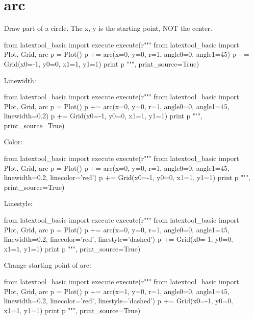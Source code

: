 \section{arc}

Draw part of a circle.
The x, y is the starting point, NOT the center.
{\small
\begin{python}
from latextool_basic import execute
execute(r"""
from latextool_basic import Plot, Grid, arc
p = Plot()
p += arc(x=0, y=0, r=1, angle0=0, angle1=45)
p += Grid(x0=-1, y0=0, x1=1, y1=1)
print p
""", print_source=True)
\end{python}
}





Linewidth:
{\small
\begin{python}
from latextool_basic import execute
execute(r"""
from latextool_basic import Plot, Grid, arc
p = Plot()
p += arc(x=0, y=0, r=1, angle0=0, angle1=45, linewidth=0.2)
p += Grid(x0=-1, y0=0, x1=1, y1=1)
print p
""", print_source=True)
\end{python}
}




Color:
{\small
\begin{python}
from latextool_basic import execute
execute(r"""
from latextool_basic import Plot, Grid, arc
p = Plot()
p += arc(x=0, y=0, r=1, angle0=0, angle1=45, 
         linewidth=0.2, linecolor='red')
p += Grid(x0=-1, y0=0, x1=1, y1=1)
print p
""", print_source=True)
\end{python}
}



Linestyle:
{\small
\begin{python}
from latextool_basic import execute
execute(r"""
from latextool_basic import Plot, Grid, arc
p = Plot()
p += arc(x=0, y=0, r=1, angle0=0, angle1=45, 
        linewidth=0.2, linecolor='red', linestyle='dashed')
p += Grid(x0=-1, y0=0, x1=1, y1=1)
print p
""", print_source=True)
\end{python}
}




Change starting point of arc:
{\small
\begin{python}
from latextool_basic import execute
execute(r"""
from latextool_basic import Plot, Grid, arc
p = Plot()
p += arc(x=1, y=0, r=1, angle0=0, angle1=45, 
        linewidth=0.2, linecolor='red', linestyle='dashed')
p += Grid(x0=-1, y0=0, x1=1, y1=1)
print p
""", print_source=True)
\end{python}
}




